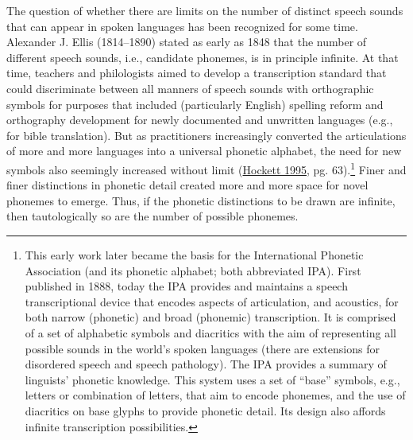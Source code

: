 \documentclass[
]{article}
\begin{document}
The question of whether there are limits on the number of distinct
speech sounds that can appear in spoken languages has been recognized
for some time. Alexander J. Ellis (1814--1890) stated as early as 1848
that the number of different speech sounds, i.e., candidate phonemes, is
in principle infinite. At that time, teachers and philologists aimed to
develop a transcription standard that could discriminate between all
manners of speech sounds with orthographic symbols for purposes that
included (particularly English) spelling reform and orthography
development for newly documented and unwritten languages (e.g., for
bible translation). But as practitioners increasingly converted the
articulations of more and more languages into a universal phonetic
alphabet, the need for new symbols also seemingly increased without
limit (\protect\hyperlink{ref-Hockett1995-phoneme}{Hockett 1995}, pg.
63).\footnote{This early work later became the basis for the
  International Phonetic Association (and its phonetic alphabet; both
  abbreviated IPA). First published in 1888, today the IPA provides and
  maintains a speech transcriptional device that encodes aspects of
  articulation, and acoustics, for both narrow (phonetic) and broad
  (phonemic) transcription. It is comprised of a set of alphabetic
  symbols and diacritics with the aim of representing all possible
  sounds in the world's spoken languages (there are extensions for
  disordered speech and speech pathology). The IPA provides a summary of
  linguists' phonetic knowledge. This system uses a set of ``base''
  symbols, e.g., letters or combination of letters, that aim to encode
  phonemes, and the use of diacritics on base glyphs to provide phonetic
  detail. Its design also affords infinite transcription possibilities.}
Finer and finer distinctions in phonetic detail created more and more
space for novel phonemes to emerge. Thus, if the phonetic distinctions
to be drawn are infinite, then tautologically so are the number of
possible phonemes.
\end{document}
